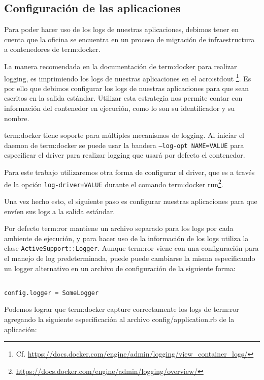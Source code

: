 \subsection{Configuración de las aplicaciones}
\label{configuracion_de_las_aplicaciones}

Para poder hacer uso de los logs de nuestras aplicaciones, debimos tener en
cuenta que la oficina se encuentra en un proceso de migración de
infraestructura a contenedores de \gls{term:docker}.

La manera recomendada en la documentación de \gls{term:docker} para realizar
logging, es imprimiendo los logs de nuestras aplicaciones en el
\gls{acro:stdout} \footnote{Cf.
\url{https://docs.docker.com/engine/admin/logging/view_container_logs/}}.  Es
por ello que debimos configurar los logs de nuestras aplicaciones para que sean
escritos en la salida estándar. Utilizar esta estrategia nos permite contar
con información del contenedor en ejecución, como lo son su identificador y su
nombre.

\gls{term:docker} tiene soporte para múltiples mecanismos de logging. Al
iniciar el daemon de \gls{term:docker} se puede usar la bandera
\texttt{--log-opt NAME=VALUE} para especificar el driver para realizar logging
que usará por defecto el contenedor.

Para este trabajo utilizaremos otra forma de configurar el driver, que es a
través de la opción \texttt{log-driver=VALUE} durante el comando
\gls{term:docker}
run\footnote{\url{https://docs.docker.com/engine/admin/logging/overview/}}.

Una vez hecho esto, el siguiente paso es configurar nuestras aplicaciones para
que envíen sus logs a la salida estándar.

Por defecto \gls{term:ror} mantiene un archivo separado para los logs por cada
ambiente de ejecución, y para hacer uso de la información de los logs utiliza
la clase \texttt{ActiveSupport::Logger}. Aunque \gls{term:ror} viene con una
configuración para el manejo de log predeterminada, puede puede cambiarse la
misma especificando un logger alternativo en un archivo de configuración de la
siguiente forma:

\begin{lstlisting}

config.logger = SomeLogger

\end{lstlisting}

Podemos lograr que \gls{term:docker} capture correctamente los logs de
\gls{term:ror} agregando la siguiente especificación al archivo
config/application.rb de la aplicación:

